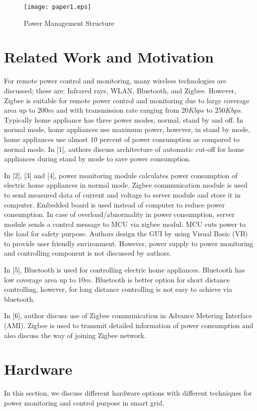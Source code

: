 \documentclass[10pt, conference, compsocconf]{IEEEtran}
\begin{document}
\begin{figure*}[t]
\centering
  \texttt{[image: paper1.eps]}
  \caption{Power Management Structure}
\end{figure*}

\section{Related Work and Motivation}
For remote power control and monitoring, many wireless technologies are discussed; these are: Infrared rays, WLAN, Bluetooth, and Zigbee. However, Zigbee is suitable for remote power control and monitoring due to large coverage area up to $200 m$ and with transmission rate ranging from $20 Kbps$ to $250 Kbps$. Typically home appliance has three power modes, normal, stand by and off. In normal mode, home appliances use maximum power, however, in stand by mode, home appliances use almost $10$ percent of  power consumption as compared to normal mode. In [1], authors discuss architecture of automatic cut-off for home appliances during stand by mode to save power consumption.

In [2], [3] and [4], power monitoring module calculates power consumption of electric home appliances in normal mode. Zigbee communication module is used to send measured data of current and voltage to server module and store it in computer. Embedded board is used instead of computer to reduce power consumption. In case of overload/abnormality in power consumption, server module sends a control message to MCU via zigbee modul. MCU cuts power to the load  for safety purpose. Authors design the GUI by using Visual Basic (VB) to provide user friendly environment. However, power supply to power monitoring and controlling component is not discussed by authors.

In [5], Bluetooth is used for controlling electric home appliances. Bluetooth has low coverage area up to $10 m$. Bluetooth is better option for short distance controlling, however, for long distance controlling is not easy to achieve via bluetooth.

In [6], author discuss use of Zigbee communication in Advance Metering Interface (AMI). Zigbee is used to transmit detailed information of power consumption and also discuss the way of joining Zigbee network.

\section{Hardware}
In this section, we discuss different hardware options with different techniques for power monitoring and control purpose in smart grid.
\end{document}
